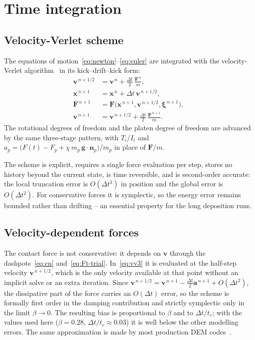 \section{Time integration}
\label{sec:integration}

\subsection{Velocity-Verlet scheme}

The equations of motion~\eqref{eq:newton}--\eqref{eq:euler} are integrated with
the velocity-Verlet algorithm~\cite{swope1982,allen2017} in its kick--drift--kick
form:
\begin{align}
  \mathbf{v}^{\,n+1/2} &= \mathbf{v}^{\,n}
    + \frac{\Delta t}{2}\,\frac{\mathbf{F}^{\,n}}{m},
    \label{eq:vv1}\\
  \mathbf{x}^{\,n+1} &= \mathbf{x}^{\,n} + \Delta t\,\mathbf{v}^{\,n+1/2},
    \label{eq:vv2}\\
  \mathbf{F}^{\,n+1} &= \mathbf{F}\bigl(\mathbf{x}^{\,n+1},
                        \mathbf{v}^{\,n+1/2},
                        \boldsymbol{\xi}^{\,n+1}\bigr),
    \label{eq:vv3}\\
  \mathbf{v}^{\,n+1} &= \mathbf{v}^{\,n+1/2}
    + \frac{\Delta t}{2}\,\frac{\mathbf{F}^{\,n+1}}{m}.
    \label{eq:vv4}
\end{align}
The rotational degrees of freedom and the platen degree of freedom are advanced
by the same three-stage pattern, with $T_{i}/I_{i}$ and
$a_{p}=\bigl(F(t)-F_{p}+\chi\,m_{p}\,\mathbf{g}\cdot\mathbf{n}_{p}\bigr)/m_{p}$ in place of $\mathbf{F}/m$.

The scheme is explicit, requires a single force evaluation per step, stores no
history beyond the current state, is time reversible, and is second-order
accurate: the local truncation error is $O(\Delta t^{3})$ in position and the
global error is $O(\Delta t^{2})$.  For conservative forces it is symplectic,
so the energy error remains bounded rather than drifting -- an essential
property for the long deposition runs.

\subsection{Velocity-dependent forces}

The contact force is not conservative: it depends on $\mathbf{v}$ through the
dashpots~\eqref{eq:cn} and~\eqref{eq:Ft-trial}.  In~\eqref{eq:vv3} it is
evaluated at the half-step velocity $\mathbf{v}^{\,n+1/2}$, which is the only
velocity available at that point without an implicit solve or an extra
iteration.  Since
$\mathbf{v}^{\,n+1/2}=\mathbf{v}^{\,n+1}-\tfrac{\Delta t}{2}\mathbf{a}^{\,n+1}
 +O(\Delta t^{2})$, the dissipative part of the force carries an $O(\Delta t)$
error, so the scheme is formally first order in the damping contribution and
strictly symplectic only in the limit $\beta\to0$.  The resulting bias is
proportional to $\beta$ and to $\Delta t/t_{c}$; with the values used here
($\beta=0.28$, $\Delta t/t_{c}\approx0.03$) it is well below the other
modelling errors.  The same approximation is made by most production DEM
codes~\cite{silbert2001,kloss2012}.

